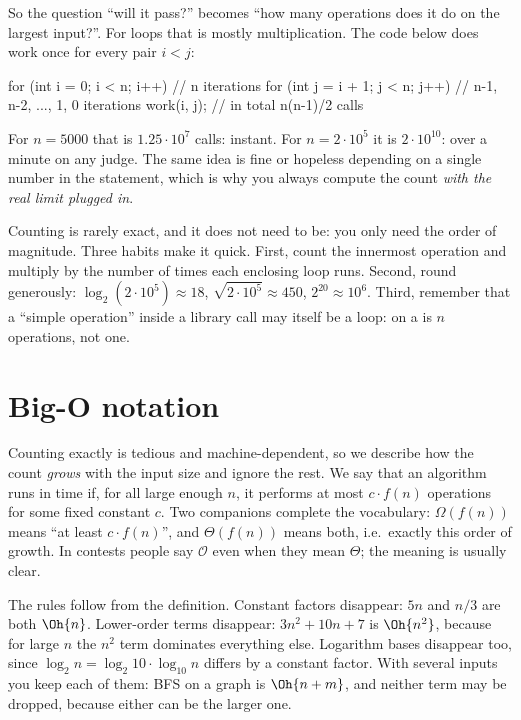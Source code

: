 So the question ``will it pass?'' becomes ``how many operations does it do on the largest input?''. For loops that is
mostly multiplication. The code below does work once for every pair $i < j$:

\begin{code}
for (int i = 0; i < n; i++)          // n iterations
    for (int j = i + 1; j < n; j++)  // n-1, n-2, ..., 1, 0 iterations
        work(i, j);                  // in total n(n-1)/2 calls
\end{code}

For $n = 5000$ that is $1.25 \cdot 10^7$ calls: instant. For $n = 2\cdot10^5$ it is $2 \cdot 10^{10}$: over a minute on any
judge. The same idea is fine or hopeless depending on a single number in the statement, which is why you always compute
the count \emph{with the real limit plugged in}.

Counting is rarely exact, and it does not need to be: you only need the order of magnitude. Three habits make it quick.
First, count the innermost operation and multiply by the number of times each enclosing loop runs. Second, round
generously: $\log_2(2\cdot10^5) \approx 18$, $\sqrt{2\cdot10^5} \approx 450$, $2^{20} \approx 10^6$. Third, remember that a
``simple operation'' inside a library call may itself be a loop:  on a  is $n$ operations, not one.

\section[Big-O notation]{Big-O notation \hfill \bronze}\label{sec:bigo}

Counting exactly is tedious and machine-dependent, so we describe how the count \emph{grows} with the input size and ignore
the rest. We say that an algorithm runs in time  if, for all large enough $n$, it performs at
most $c \cdot f(n)$ operations for some fixed constant $c$. Two companions complete the vocabulary: $\Omega(f(n))$ means ``at
least $c\cdot f(n)$'', and $\Theta(f(n))$ means both, i.e.\ exactly this order of growth. In contests people say
$\mathcal{O}$ even when they mean $\Theta$; the meaning is usually clear.

The rules follow from the definition. Constant factors disappear: $5n$ and $n / 3$ are both $\Oh{n}$. Lower-order terms
disappear: $3n^2 + 10n + 7$ is $\Oh{n^2}$, because for large $n$ the $n^2$ term dominates everything else. Logarithm bases
disappear too, since $\log_2 n = \log_2 10 \cdot \log_{10} n$ differs by a constant factor. With several inputs you keep
each of them: BFS on a graph is $\Oh{n + m}$, and neither term may be dropped, because either can be the larger one.


